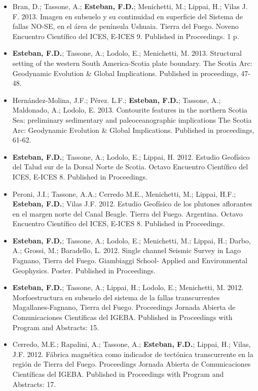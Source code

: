 \documentclass[11pt, a4paper]{article}
\begin{document}
\begin{itemize}
  \item Bran, D.; Tassone, A.; \textbf{Esteban, F.D.}; Menichetti, M.; Lippai, H.; Vilas J. F. 2013. Imagen en subsuelo y su continuidad en superficie del Sistema de fallas NO-SE, en el área de península Ushuaia. Tierra del Fuego. Noveno Encuentro Científico del ICES, E-ICES 9. Published in Proceedings. 1 p.

  \item \textbf{Esteban, F.D.}; Tassone, A.; Lodolo, E.; Menichetti, M. 2013. Structural setting of the western South America-Scotia plate boundary. The Scotia Arc: Geodynamic Evolution \& Global Implications. Published in proceedings, 47-48.

  \item Hernández-Molina, J.F.; Pérez. L.F.; \textbf{Esteban, F.D.}; Tassone, A.; Maldonado, A.; Lodolo, E. 2013. Contourite features in the northern Scotia Sea: preliminary sedimentary and paleoceanographic implications The Scotia Arc: Geodynamic Evolution \& Global Implications. Published in proceedings, 61-62.

  \item \textbf{Esteban, F.D.}; Tassone, A.; Lodolo, E.; Lippai, H. 2012. Estudio Geofísico del Talud sur de la Dorsal Norte de Scotia. Octavo Encuentro Científico del ICES, E-ICES 8. Published in Proceedings.

  \item Peroni, J.I.; Tassone, A.A.; Cerredo M.E., Menichetti, M.; Lippai, H.F.; \textbf{Esteban, F.D.}; Vilas J.F. 2012. Estudio Geofísico de los plutones aflorantes en el margen norte del Canal Beagle. Tierra del Fuego. Argentina. Octavo Encuentro Científico del ICES, E-ICES 8. Published in Proceedings.

  \item \textbf{Esteban, F.D.}; Tassone, A.; Lodolo, E.; Menichetti, M.; Lippai, H.; Darbo, A.; Grossi, M.; Baradello, L. 2012. Single channel Seismic Survey in Lago Fagnano, Tierra del Fuego. Giambiaggi School- Applied and Environmental Geophysics. Poster. Published in Proceedings.

  \item \textbf{Esteban, F.D.}; Tassone, A.; Lippai, H.; Lodolo, E.; Menichetti, M. 2012. Morfoestructura en subsuelo del sistema de la fallas transcurrentes Magallanes-Fagnano, Tierra del Fuego. Proceedings Jornada Abierta de Comunicaciones Científicas del IGEBA. Published in Proceedings with Program and Abstracts: 15.

  \item Cerredo, M.E.; Rapalini, A.; Tassone, A.; \textbf{Esteban, F.D.}; Lippai, H.; Vilas, J.F. 2012. Fábrica magnética como indicador de tectónica transcurrente en la región de Tierra del Fuego. Proceedings Jornada Abierta de Comunicaciones Científicas del IGEBA. Published in Proceedings with Program and Abstracts: 17.


\end{itemize}
\end{document}
